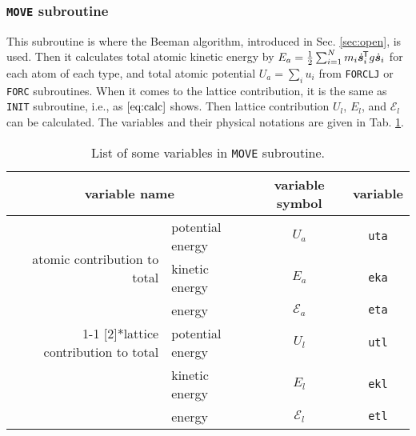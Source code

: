 
\subsubsection{\texttt{MOVE} subroutine}

This subroutine is where the Beeman algorithm, introduced in Sec. \ref{sec:open}, is used.
Then it calculates total atomic kinetic energy by
$E_a = \frac{ 1 }{ 2 } \sum_{i=1}^{N} m_i \dot{ \bm{s} }_i ^{\mkern-1.5mu\mathsf{T}}
	g \dot{ \bm{s} }_i$ for each atom of each type,
and total atomic potential $U_a = \sum_{i} u_i$ from \texttt{FORCLJ} or \texttt{FORC}
subroutines.
When it comes to the lattice contribution, it is the same as \texttt{INIT} subroutine,
i.e., as $\eqref{eq:calc}$ shows. Then lattice contribution $U_l$, $E_l$, and
$\mathscr{E}_l$ can be calculated. The variables and their physical notations are given in
Tab. \ref{tab:move}.

\begin{table}[h]
	\centering
	\caption{List of some variables in \texttt{MOVE} subroutine.}
	\begin{tabular}{@{}rlcc@{}}
		\toprule
		\multicolumn{2}{c}{variable name}                                                 & variable symbol  & variable                       \\
		\midrule
		\multirow{3}[2]{*}{atomic contribution to total}                                  & potential energy & $U_a$           & \texttt{uta} \\
		                                                                                  & kinetic energy   & $E_a$           & \texttt{eka} \\
		                                                                                  & energy           & $\mathscr{E}_a$ & \texttt{eta} \\
		\cmidrule{1-1}\cmidrule{4-4}    \multirow{3}[2]{*}{lattice contribution to total} & potential energy & $U_l$           & \texttt{utl} \\
		                                                                                  & kinetic energy   & $E_l$           & \texttt{ekl} \\
		                                                                                  & energy           & $\mathscr{E}_l$ & \texttt{etl} \\
		\bottomrule
	\end{tabular}
	\label{tab:move}%
\end{table}%
